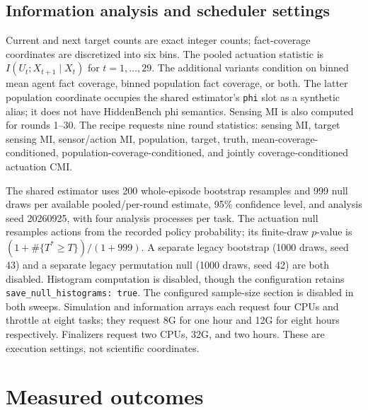 \documentclass[10pt,a4paper]{article}
\begin{document}
\subsection{Information analysis and scheduler settings}
Current and next target counts are exact integer counts; fact-coverage
coordinates are discretized into six bins. The pooled actuation statistic is
$I(U_t;X_{t+1}\mid X_t)$ for $t=1,\ldots,29$. The additional variants condition
on binned mean agent fact coverage, binned population fact coverage, or both.
The latter population coordinate occupies the shared estimator's \texttt{phi}
slot as a synthetic alias; it does not have HiddenBench phi semantics.
Sensing MI is also computed for rounds 1--30. The recipe requests nine round
statistics: sensing MI, target sensing MI, sensor/action MI, population,
target, truth, mean-coverage-conditioned, population-coverage-conditioned,
and jointly coverage-conditioned actuation CMI.

The shared estimator uses 200 whole-episode bootstrap resamples and 999 null
draws per available pooled/per-round estimate, 95\% confidence level, and
analysis seed 20260925, with four analysis processes per task. The actuation
null resamples actions from the recorded policy probability; its finite-draw
$p$-value is $(1+\#\{T^*\ge T\})/(1+999)$. A separate legacy bootstrap
(1000 draws, seed 43) and a separate legacy permutation null (1000 draws,
seed 42) are both disabled. Histogram computation is disabled, though the
configuration retains \texttt{save\_null\_histograms: true}. The configured
sample-size section is disabled in both sweeps. Simulation and information
arrays each request four CPUs and throttle at eight tasks; they request 8G
for one hour and 12G for eight hours respectively. Finalizers request two
CPUs, 32G, and two hours. These are execution settings, not scientific
coordinates.

\section{Measured outcomes}
\end{document}
